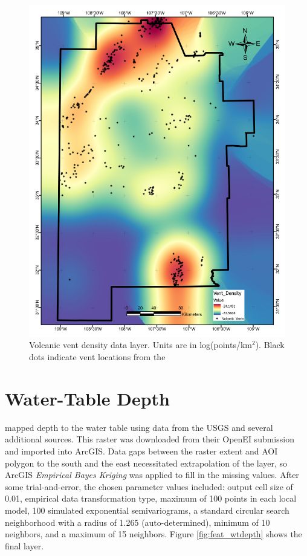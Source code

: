 \begin{figure}[H]
\centering
\includegraphics[width=0.75\linewidth]{templates/images/Figure-VentDensity.pdf}
\caption[Volcanic vent data layer]{Volcanic vent density data layer. Units are in log(points/km$^2$). Black dots indicate vent locations from the \protect\citet{nmbgmr_nmbgmr_2021}}
\label{fig:feat_vents}
\end{figure}
\pagebreak

\section{Water-Table Depth}\label{app:dl_wt_depth}
\citet{bielicki_hydrogeolgic_2015} mapped depth to the water table using data from the USGS and several additional sources. This raster was downloaded from their OpenEI submission \citep{kelley_geothermal_2015} and imported into ArcGIS. Data gaps between the raster extent and AOI polygon to the south and the east necessitated extrapolation of the layer, so ArcGIS \textit{Empirical Bayes Kriging} was applied to fill in the missing values. After some trial-and-error, the chosen parameter values included: output cell size of 0.01, empirical data transformation type, maximum of 100 points in each local model, 100 simulated exponential semivariograms, a standard circular search neighborhood with a radius of 1.265 (auto-determined), minimum of 10 neighbors, and a maximum of 15 neighbors. Figure \ref{fig:feat_wtdepth} shows the final layer.
\vfill
\pagebreak

